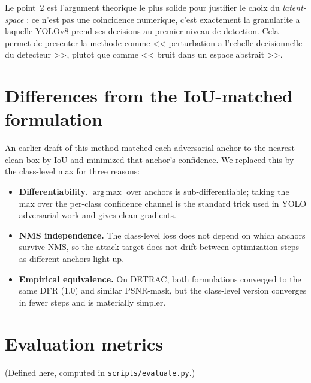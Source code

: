 \documentclass[11pt,a4paper]{article}
\DeclareMathOperator*{\argmax}{arg\,max}
\begin{document}
\begin{supervisornote}
Le point~2 est l'argument theorique le plus solide pour justifier le choix
du \emph{latent-space} : ce n'est pas une coincidence numerique, c'est
exactement la granularite a laquelle YOLOv8 prend ses decisions au premier
niveau de detection. Cela permet de presenter la methode comme
<< perturbation a l'echelle decisionnelle du detecteur >>, plutot que
comme << bruit dans un espace abstrait >>.
\end{supervisornote}

\section{Differences from the IoU-matched formulation}\label{sec:iou-diff}

An earlier draft of this method matched each adversarial anchor to the
nearest clean box by IoU and minimized that anchor's confidence. We replaced
this by the class-level max for three reasons:

\begin{itemize}[leftmargin=*, itemsep=2pt]
\item \textbf{Differentiability.} $\argmax$ over anchors is sub-differentiable;
taking the max over the per-class confidence channel is the standard trick
used in YOLO adversarial work and gives clean gradients.
\item \textbf{NMS independence.} The class-level loss does not depend on
which anchors survive NMS, so the attack target does not drift between
optimization steps as different anchors light up.
\item \textbf{Empirical equivalence.} On DETRAC, both formulations converged
to the same DFR (1.0) and similar PSNR-mask, but the class-level version
converges in fewer steps and is materially simpler.
\end{itemize}

\section{Evaluation metrics}\label{sec:metrics}

(Defined here, computed in \texttt{scripts/evaluate.py}.)
\end{document}
